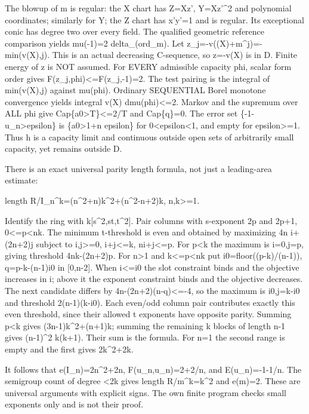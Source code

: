 \documentclass[11pt]{article}
\begin{document}
The blowup of m is regular: the X chart has Z=Xz', Y=Xz'\textasciicircum{}2 and polynomial coordinates; similarly for Y; the Z chart has x'y'=1 and is regular. Its exceptional conic has degree two over every field. The qualified geometric reference comparison yields mu(-1)=2 delta\_(ord\_m). Let z\_j=-v((X)+m\textasciicircum{}j)=-min(v(X),j). This is an actual decreasing C-sequence, so z=-v(X) is in D. Finite energy of z is NOT assumed. For EVERY admissible capacity phi, scalar form order gives F(z\_j,phi)<=F(z\_j,-1)=2. The test pairing is the integral of min(v(X),j) against mu(phi). Ordinary SEQUENTIAL Borel monotone convergence yields integral v(X) dmu(phi)<=2. Markov and the supremum over ALL phi give Cap\{a0>T\}<=2/T and Cap\{q\}=0. The error set \{-1-u\_n>epsilon\} is \{a0>1+n epsilon\} for 0<epsilon<1, and empty for epsilon>=1. Thus h is a capacity limit and continuous outside open sets of arbitrarily small capacity, yet remains outside D.

There is an exact universal parity length formula, not just a leading-area estimate:

length R/I\_n\textasciicircum{}k=(n\textasciicircum{}2+n)k\textasciicircum{}2+(n\textasciicircum{}2-n+2)k, n,k>=1.

Identify the ring with k[s\textasciicircum{}2,st,t\textasciicircum{}2]. Pair columns with s-exponent 2p and 2p+1, 0<=p<nk. The minimum t-threshold is even and obtained by maximizing 4n i+(2n+2)j subject to i,j>=0, i+j<=k, ni+j<=p. For p<k the maximum is i=0,j=p, giving threshold 4nk-(2n+2)p. For n>1 and k<=p<nk put i0=floor((p-k)/(n-1)), q=p-k-(n-1)i0 in [0,n-2]. When i<=i0 the slot constraint binds and the objective increases in i; above it the exponent constraint binds and the objective decreases. The next candidate differs by 4n-(2n+2)(n-q)<=-4, so the maximum is i0,j=k-i0 and threshold 2(n-1)(k-i0). Each even/odd column pair contributes exactly this even threshold, since their allowed t exponents have opposite parity. Summing p<k gives (3n-1)k\textasciicircum{}2+(n+1)k; summing the remaining k blocks of length n-1 gives (n-1)\textasciicircum{}2 k(k+1). Their sum is the formula. For n=1 the second range is empty and the first gives 2k\textasciicircum{}2+2k.

It follows that e(I\_n)=2n\textasciicircum{}2+2n, F(u\_n,u\_n)=2+2/n, and E(u\_n)=-1-1/n. The semigroup count of degree <2k gives length R/m\textasciicircum{}k=k\textasciicircum{}2 and e(m)=2. These are universal arguments with explicit signs. The own finite program checks small exponents only and is not their proof.
\end{document}
